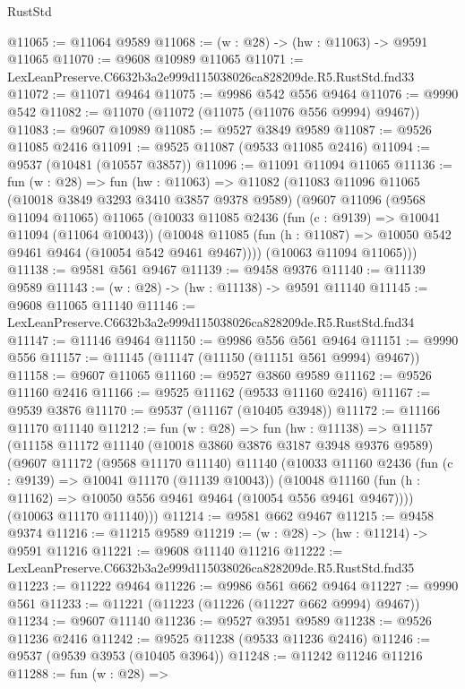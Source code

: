 \begin{lexlean}{RustStd}
\begin{coremodule}
@11065 := @11064 @9589
@11068 := (w : @28) -> (hw : @11063) -> @9591 @11065
@11070 := @9608 @10989 @11065
@11071 := LexLeanPreserve.C6632b3a2e999d115038026ca828209de.R5.RustStd.fnd33
@11072 := @11071 @9464
@11075 := @9986 @542 @556 @9464
@11076 := @9990 @542
@11082 := @11070 (@11072 (@11075 (@11076 @556 @9994) @9467))
@11083 := @9607 @10989
@11085 := @9527 @3849 @9589
@11087 := @9526 @11085 @2416
@11091 := @9525 @11087 (@9533 @11085 @2416)
@11094 := @9537 (@10481 (@10557 @3857))
@11096 := @11091 @11094 @11065
@11136 := fun (w : @28) =>
  fun (hw : @11063) =>
  @11082
    (@11083
      @11096
      @11065
      (@10018 @3849 @3293 @3410 @3857 @9378 @9589)
      (@9607
        @11096
        (@9568 @11094 @11065)
        @11065
        (@10033
          @11085
          @2436
          (fun (c : @9139) => @10041 @11094 (@11064 @10043))
          (@10048 @11085 (fun (h : @11087) => @10050 @542 @9461 @9464 (@10054 @542 @9461 @9467))))
        (@10063 @11094 @11065)))
@11138 := @9581 @561 @9467
@11139 := @9458 @9376
@11140 := @11139 @9589
@11143 := (w : @28) -> (hw : @11138) -> @9591 @11140
@11145 := @9608 @11065 @11140
@11146 := LexLeanPreserve.C6632b3a2e999d115038026ca828209de.R5.RustStd.fnd34
@11147 := @11146 @9464
@11150 := @9986 @556 @561 @9464
@11151 := @9990 @556
@11157 := @11145 (@11147 (@11150 (@11151 @561 @9994) @9467))
@11158 := @9607 @11065
@11160 := @9527 @3860 @9589
@11162 := @9526 @11160 @2416
@11166 := @9525 @11162 (@9533 @11160 @2416)
@11167 := @9539 @3876
@11170 := @9537 (@11167 (@10405 @3948))
@11172 := @11166 @11170 @11140
@11212 := fun (w : @28) =>
  fun (hw : @11138) =>
  @11157
    (@11158
      @11172
      @11140
      (@10018 @3860 @3876 @3187 @3948 @9376 @9589)
      (@9607
        @11172
        (@9568 @11170 @11140)
        @11140
        (@10033
          @11160
          @2436
          (fun (c : @9139) => @10041 @11170 (@11139 @10043))
          (@10048 @11160 (fun (h : @11162) => @10050 @556 @9461 @9464 (@10054 @556 @9461 @9467))))
        (@10063 @11170 @11140)))
@11214 := @9581 @662 @9467
@11215 := @9458 @9374
@11216 := @11215 @9589
@11219 := (w : @28) -> (hw : @11214) -> @9591 @11216
@11221 := @9608 @11140 @11216
@11222 := LexLeanPreserve.C6632b3a2e999d115038026ca828209de.R5.RustStd.fnd35
@11223 := @11222 @9464
@11226 := @9986 @561 @662 @9464
@11227 := @9990 @561
@11233 := @11221 (@11223 (@11226 (@11227 @662 @9994) @9467))
@11234 := @9607 @11140
@11236 := @9527 @3951 @9589
@11238 := @9526 @11236 @2416
@11242 := @9525 @11238 (@9533 @11236 @2416)
@11246 := @9537 (@9539 @3953 (@10405 @3964))
@11248 := @11242 @11246 @11216
@11288 := fun (w : @28) =>

\end{coremodule}
\end{lexlean}
